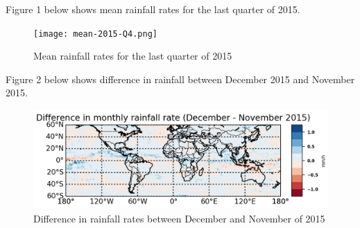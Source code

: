 \documentclass[12pt]{article}
\begin{document}
Figure 1 below shows mean rainfall rates for the last quarter of 2015.

\begin{figure}[h]
    \label{fig:meanQ42015}
\centering
\texttt{[image: mean-2015-Q4.png]}
\caption{Mean rainfall rates for the last quarter of 2015}
\end{figure}

Figure 2 below shows difference in rainfall between December 2015 and November 2015.

\begin{figure}[H]
    \label{fig:difference}
\begin{center}
   \includegraphics[width=1.25\linewidth]{diff-example.png}
\end{center}
\caption{Difference in rainfall rates between December and November of 2015}
\end{figure}



\end{document}
